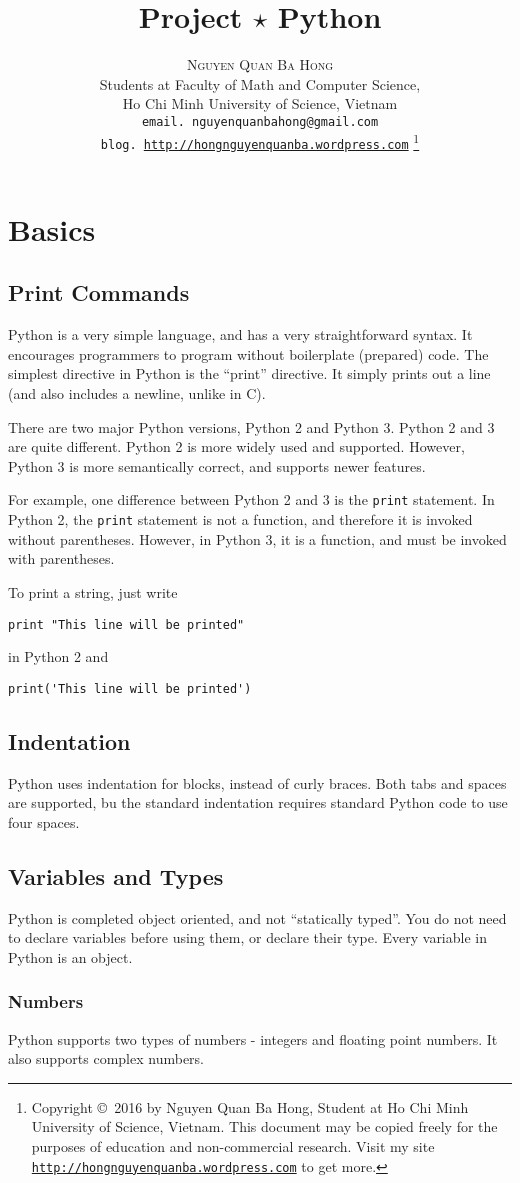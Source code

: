 \documentclass[a4paper,oneside]{book}
\title{\Huge Project $\star$ Python}
\author{\textsc{Nguyen Quan Ba Hong}\\
{\small Students at Faculty of Math and Computer Science,}\\ 
{\small Ho Chi Minh University of Science, Vietnam} \\
{\small \texttt{email. nguyenquanbahong@gmail.com}}\\
{\small \texttt{blog. \url{http://hongnguyenquanba.wordpress.com}} 
\footnote{Copyright \copyright\ 2016 by Nguyen Quan Ba Hong, Student at Ho Chi Minh University of Science, Vietnam. This document may be copied freely for the purposes of education and non-commercial research. Visit my site \texttt{\url{http://hongnguyenquanba.wordpress.com}} to get more.}}}
\numberwithin{equation}{chapter}
\begin{document}
\frontmatter
\maketitle
\tableofcontents
\mainmatter
\chapter{Basics}
\section{Print Commands}
Python is a very simple language, and has a very straightforward syntax. It encourages programmers to program without boilerplate (prepared) code. The simplest directive in Python is the ``print'' directive. It simply prints out a line (and also includes a newline, unlike in C).

There are two major Python versions, Python 2 and Python 3. Python 2 and 3 are quite different. Python 2 is more widely used and supported. However, Python 3 is more semantically correct, and supports newer features.

For example, one difference between Python 2 and 3 is the \texttt{print} statement. In Python 2, the \texttt{print} statement is not a function, and therefore it is invoked without parentheses. However, in Python 3, it is a function, and must be invoked with parentheses.

To print a string, just write
\begin{verbatim}
print "This line will be printed"
\end{verbatim}
in Python 2 and
\begin{verbatim}
print('This line will be printed')
\end{verbatim}
\section{Indentation}
Python uses indentation for blocks, instead of curly braces. Both tabs and spaces are supported, bu the standard indentation requires standard Python code to use four spaces.
\section{Variables and Types}
Python is completed object oriented, and not ``statically typed''. You do not need to declare variables before using them, or declare their type. Every variable in Python is an object.
\subsection{Numbers}
Python supports two types of numbers - integers and floating point numbers. It also supports complex numbers.
\end{document}
